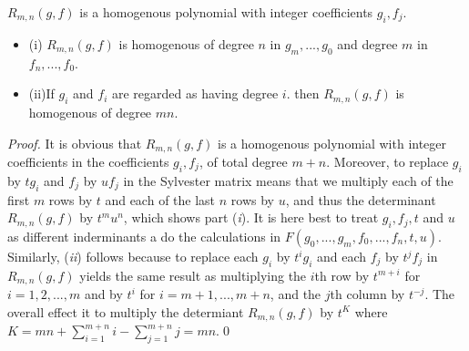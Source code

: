 \begin{theorem} $R_{m,n}(g,f)$ is a homogenous polynomial with integer coefficients $g_i,f_j$.
\begin{itemize}
\item[]{(i)} $R_{m,n}(g,f)$ is homogenous of degree $n$ in $g_m,...,g_0$ and degree $m$ in $f_n,...,f_0$.
\item[]{(ii)}If $g_i$ and $f_i$ are regarded as having degree $i$. then $R_{m,n}(g,f)$ is homogenous of degree $mn$.
\end{itemize}
\end{theorem}
\begin{proof}
It is obvious that $R_{m,n}(g,f)$ is a homogenous polynomial with integer coefficients in the coefficients $g_i, f_j$, of total degree $m+n$.
Moreover, to replace $g_i$ by $tg_i$ and $f_j$ by $uf_j$ in the Sylvester matrix means that we multiply each of the first $m$ rows by $t$
and each of the last $n$ rows by $u$, and thus the determinant $R_{m,n}(g,f)$ by $t^mu^n$, which shows part ({\it{i}}). It is here best to 
treat $g_i, f_j, t$ and $u$ as different inderminants a  do the calculations in $F(g_0,...,g_m, f_0,...,f_n, t,u)$.\\
Similarly, ({\it ii}) follows because to replace each $g_i$ by $t^ig_i$ and each $f_j$ by $t^jf_j$ in $R_{m,n}(g,f)$ yields the same result as 
multiplying the $i$th row by $t^{m+i}$ for $i=1,2,...,m$ and by $t^i$ for $i=m+1,...,m+n$, and the $j$th column by $t^{-j}$\/. The overall 
effect it to multiply the determiant $R_{m,n}(g,f)$ by $t^K$ where $K = mn+\sum_{i=1}^{m+n} i - \sum_{j=1}^{m+n} j = mn$.\qed 
\end{proof}

